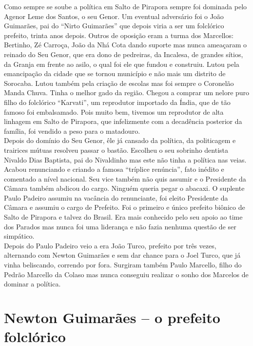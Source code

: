 \documentclass[12pt,brazil,]{book}
\begin{document}
Como sempre se soube a política em Salto de Pirapora sempre foi dominada
pelo Agenor Leme dos Santos, o seu Genor. Um eventual adversário foi o
João Guimarães, pai do ``Nirto Guimarães'' que depois viria a ser um
folclórico prefeito, trinta anos depois. Outros de oposição eram a turma
dos Marcellos: Bertinho, Zé Carroça, João da Nhá Cota dando suporte mas
nunca ameaçaram o reinado do Seu Genor, que era dono de pedreiras, da
Incalesa, de grandes sítios, da Granja em frente ao asilo, o qual foi
ele que fundou e construiu. Lutou pela emancipação da cidade que se
tornou município e não mais um distrito de Sorocaba. Lutou também pela
criação de escolas mas foi sempre o Coronelão Manda Chuva. Tinha o
melhor gado da região. Chegou a comprar um nelore puro filho do
folclórico ``Karvati'', um reprodutor importado da Índia, que de tão
famoso foi embalsamado. Pois muito bem, tivemos um reprodutor de alta
linhagem em Salto de Pirapora, que infelizmente com a decadência
posterior da família, foi vendido a peso para o matadouro.\\
Depois do domínio do Seu Genor, êle já cansado da política, da
politicagem e trairices mútuas resolveu passar o bastão. Escolheu o seu
sobrinho dentista Nivaldo Dias Baptista, pai do Nivaldinho mas este não
tinha a política nas veias. Acabou renunciando e criando a famosa
``tríplice renúncia'', fato inédito e comentado a nível nacional. Seu
vice também não quis assumir e o Presidente da Câmara também abdicou do
cargo. Ninguém queria pegar o abacaxi. O suplente Paulo Padeiro assumiu
na vacância do renunciante, foi eleito Presidente da Câmara e assumiu o
cargo de Prefeito. Foi o primeiro e único prefeito biônico de Salto de
Pirapora e talvez do Brasil. Era mais conhecido pelo seu apoio ao time
dos Parados mas nunca foi uma liderança e não fazia nenhuma questão de
ser simpático.\\
Depois do Paulo Padeiro veio a era João Turco, prefeito por três vezes,
alternando com Newton Guimarães e sem dar chance para o Joel Turco, que
já vinha beliscando, correndo por fora. Surgiram também Paulo Marcello,
filho do Pedrão Marcello da Colaso mas nunca conseguiu realizar o sonho
dos Marcelos de dominar a política.

\section{Newton Guimarães -- o prefeito
folclórico}\label{newton-guimaruxe3es-o-prefeito-folcluxf3rico}
\end{document}
